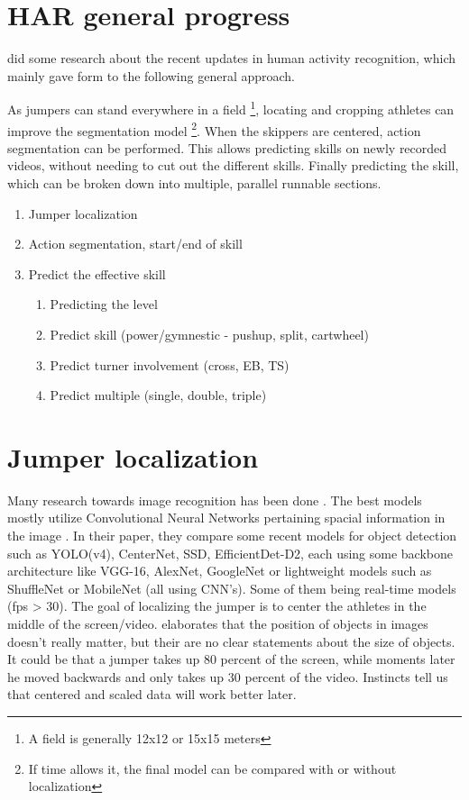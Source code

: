 \section{HAR general progress}

\textcite{Pareek_2020} did some research about the recent updates in human activity recognition, which mainly gave form to the following general approach.

As jumpers can stand everywhere in a field \footnote{A field is generally 12x12 or 15x15 meters}, locating and cropping athletes can improve the segmentation model \footnote{If time allows it, the final model can be compared with or without localization}. When the skippers are centered, action segmentation can be performed. This allows predicting skills on newly recorded videos, without needing to cut out the different skills. Finally predicting the skill, which can be broken down into multiple, parallel runnable sections.

\begin{enumerate}
    \item Jumper localization
    \item Action segmentation, start/end of skill
    \item Predict the effective skill
    \begin{enumerate}
        \item Predicting the level
        \item Predict skill (power/gymnestic - pushup, split, cartwheel)
        \item Predict turner involvement (cross, EB, TS)
        \item Predict multiple (single, double, triple)
    \end{enumerate}
\end{enumerate}

\section{Jumper localization}
\label{subsec:jumper localization}

Many research towards image recognition has been done \autocite{Zou_2023}. The best models mostly utilize Convolutional Neural Networks pertaining spacial information in the image \autocite{Zaidi_2021}. In their paper, they compare some recent models for object detection such as YOLO(v4), CenterNet, SSD, EfficientDet-D2, each using some backbone architecture like VGG-16, AlexNet, GoogleNet or lightweight models such as ShuffleNet or MobileNet (all using CNN's). Some of them being real-time models (fps > 30).
The goal of localizing the jumper is to center the athletes in the middle of the screen/video. \textcite{Bharadiya_2023} elaborates that the position of objects in images doesn't really matter, but their are no clear statements about the size of objects. It could be that a jumper takes up 80 percent of the screen, while moments later he moved backwards and only takes up 30 percent of the video. Instincts tell us that centered and scaled data will work better later.

